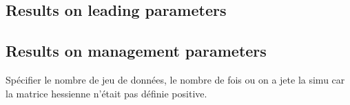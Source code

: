 \subsection{Results on leading parameters}
\subsection{Results on management parameters}
Spécifier le nombre de jeu de données,  le nombre de fois ou on a jete
la simu car la matrice hessienne n'était pas définie positive.







